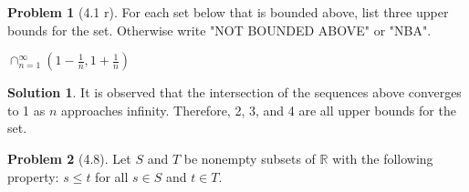 \documentclass[12pt]{article}
\theoremstyle{definition} %
\newtheorem{solution}{Solution}
\newtheorem{problem}{Problem}
\theoremstyle{plain} %
\begin{document}
\begin{problem}[4.1 r]
    
For each set below that is bounded above, list three upper bounds for the set. Otherwise write "NOT BOUNDED ABOVE" or "NBA".

$\cap_{n=1}^\infty\left( 1-\frac{1}{n}, 1+\frac{1}{n} \right)$ 

\end{problem}
\begin{solution}    
It is observed that the intersection of the sequences above converges to 1 as $n$ approaches infinity. Therefore, 2, 3, and 4 are all upper bounds for the set.
\end{solution}

\begin{problem}[4.8]
 Let $S$ and $T$ be nonempty subsets of $\mathbb{R}$ with the following property:
$s\leq t$ for all $s \in S$ and $t \in T$.

   
\end{problem}
\end{document}
